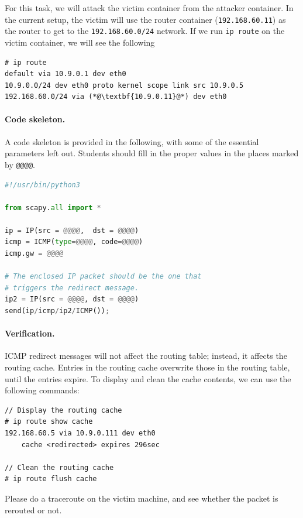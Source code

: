 For this task, we will attack the victim container from 
the attacker container. In the current setup, 
the victim will use the router container (\texttt{192.168.60.11}) as
the router to get to the \texttt{192.168.60.0/24} network. If
we run \texttt{ip route} on the victim container, we will
see the following

\begin{lstlisting}
# ip route
default via 10.9.0.1 dev eth0 
10.9.0.0/24 dev eth0 proto kernel scope link src 10.9.0.5 
192.168.60.0/24 via (*@\textbf{10.9.0.11}@*) dev eth0
\end{lstlisting}
 

\paragraph{Code skeleton.} A code skeleton is provided in the following, with
some of the essential parameters left out. Students should fill in the proper 
values in the places marked by \texttt{@@@@}.  


\begin{lstlisting}[language=python]
#!/usr/bin/python3

from scapy.all import *

ip = IP(src = @@@@,  dst = @@@@)
icmp = ICMP(type=@@@@, code=@@@@)
icmp.gw = @@@@

# The enclosed IP packet should be the one that 
# triggers the redirect message. 
ip2 = IP(src = @@@@, dst = @@@@)
send(ip/icmp/ip2/ICMP());
\end{lstlisting}
 

\paragraph{Verification.}
ICMP redirect messages will not affect the routing table; instead, it 
affects the routing cache. Entries in the routing cache overwrite 
those in the routing table, until the entries expire. To display 
and clean the cache contents, we can use the following commands: 

\begin{lstlisting}
// Display the routing cache 
# ip route show cache
192.168.60.5 via 10.9.0.111 dev eth0
    cache <redirected> expires 296sec

// Clean the routing cache
# ip route flush cache
\end{lstlisting}


Please do a traceroute on the victim machine, and see whether the packet
is rerouted or not. 

